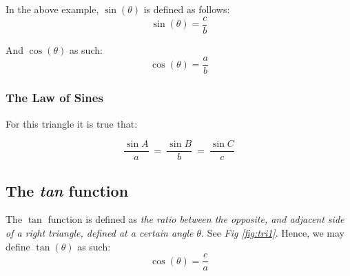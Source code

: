 \documentclass[a4paper, 12pt]{article}
\begin{document}
In the above example, $\sin(\theta)$ is defined as follows: $$\sin(\theta) = \frac{c}{b}$$

And $\cos(\theta)$ as such: $$\cos(\theta) = \frac{a}{b}$$








\subsubsection{The Law of Sines}



\begin{center}
 \bigbreak


For this triangle it is true that:
\end{center}
$$\frac{\sin{A}}{a} \ = \ \frac{\sin{B}}{b} \ = \ \frac{\sin{C}}{c}$$


\bigbreak







\subsection{The \emph{tan} function}



The $\tan$ function is defined as \emph{the ratio between the opposite, and adjacent side of a right triangle, defined at a certain angle $\theta$}. See \emph{Fig \ref{fig:tri1}}.
Hence, we may define $\tan(\theta)$ as such: \bigbreak
$$\cos(\theta) = \frac{c}{a}$$
\end{document}
